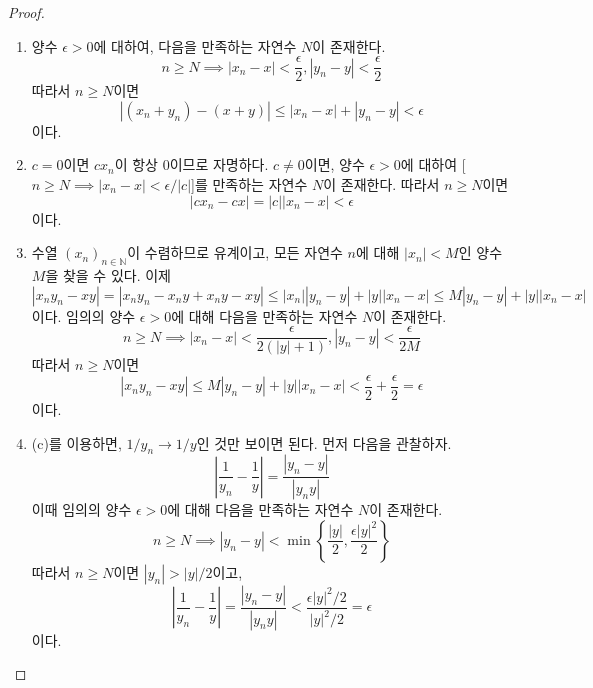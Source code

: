 \documentclass[11pt]{book}
\numberwithin{equation}{chapter}
\def\NN{\mathbb{N}}
\def\eps{\epsilon}
\newcommand{\abs}[1]{\left\vert#1\right\vert}
\theoremstyle{definition}
\begin{document}
\begin{proof}
        \begin{enumerate} [label=(\alph*), leftmargin=2\parindent]
            \item
            양수 \(\eps > 0\)에 대하여, 다음을 만족하는 자연수 \(N\)이 존재한다.
            \[
            n \ge N \implies \abs{x_n - x} < \frac{\eps}{2}, \abs{y_n - y} < \frac{\eps}{2}    
            \]
            따라서 \(n \ge N\)이면
            \[
            \abs{(x_n + y_n) - (x + y)} \le \abs{x_n - x} + \abs{y_n - y} < \eps    
            \]
            이다.
            \item
            \(c = 0\)이면 \(cx_n\)이 항상 0이므로 자명하다. \(c \ne 0\)이면, 양수 \(\eps > 0\)에 대하여 [\(n \ge N \implies \abs{x_n - x} < \eps / \abs{c}\)]를 만족하는 자연수 \(N\)이 존재한다. 따라서 \(n \ge N\)이면
            \[
            \abs{cx_n - cx} = \abs{c}\abs{x_n - x} < \eps    
            \]
            이다.
            \item
            수열 \((x_n)_{n \in \NN}\)이 수렴하므로 유계이고, 모든 자연수 \(n\)에 대해 \(\abs{x_n} < M\)인 양수 \(M\)을 찾을 수 있다. 이제
            \[
            \abs{x_n y_n - xy} = \abs{x_n y_n - x_n y + x_n y - xy} \le \abs{x_n} \abs{y_n - y} + \abs{y} \abs{x_n - x} \le M \abs{y_n - y} + \abs{y} \abs{x_n - x}   
            \]
            이다. 임의의 양수 \(\eps > 0\)에 대해 다음을 만족하는 자연수 \(N\)이 존재한다.
            \[
            n \ge N \implies \abs{x_n - x} < \frac{\eps}{2(\abs{y}+1)}, \abs{y_n - y} < \frac{\eps}{2M}    
            \]
            따라서 \(n \ge N\)이면
            \[
                \abs{x_n y_n - xy} \le M \abs{y_n - y} + \abs{y} \abs{x_n - x}  < \frac{\eps}{2} + \frac{\eps}{2} = \eps
            \]
            이다.
            \item
            (c)를 이용하면, \(1/y_n \to 1/y\)인 것만 보이면 된다. 먼저 다음을 관찰하자.
            \[
            \abs{\frac{1}{y_n} - \frac{1}{y}} = \frac{\abs{y_n - y}}{\abs{y_n y}}    
            \]
            이때 임의의 양수 \(\eps > 0\)에 대해 다음을 만족하는 자연수 \(N\)이 존재한다.
            \[
            n \ge N \implies \abs{y_n - y} < \min \left\{\frac{\abs{y}}{2}, \frac{\eps \abs{y}^2}{2}\right\}  
            \]
            따라서 \(n \ge N\)이면 \(\abs{y_n} > \abs{y} / 2\)이고, 
            \[
                \abs{\frac{1}{y_n} - \frac{1}{y}} = \frac{\abs{y_n - y}}{\abs{y_n y}} < \frac{\eps \abs{y}^2/ 2}{\abs{y}^2 / 2} = \eps 
            \]
            이다.
        \end{enumerate}
    \end{proof}
\end{document}
